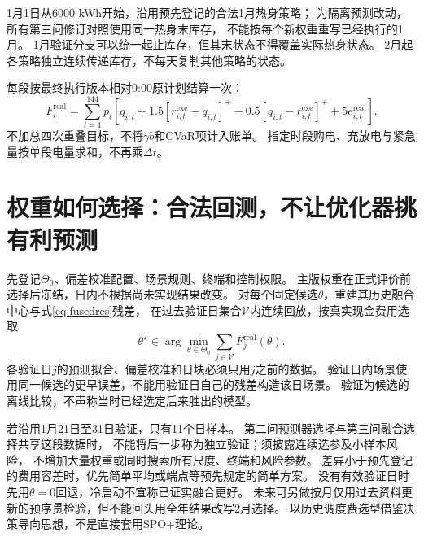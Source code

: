 \documentclass[UTF8,11pt]{ctexart}
\newcommand{\pos}[1]{[#1]^+}
\begin{document}
1月1日从6000 kWh开始，沿用预先登记的合法1月热身策略；
为隔离预测改动，所有第三问修订对照使用同一热身末库存，
不能按每个新权重重写已经执行的1月。
1月验证分支可以统一起止库存，但其末状态不得覆盖实际热身状态。
2月起各策略独立连续传递库存，不每天复制其他策略的状态。

每段按最终执行版本相对0:00原计划结算一次：
\begin{equation}\label{eq:bill}
 F_i^{\mathrm{real}}=\sum_{t=1}^{144}p_t
 \left[q_{i,t}+1.5\pos{r^{\mathrm{exe}}_{i,t}-q_{i,t}}
 -0.5\pos{q_{i,t}-r^{\mathrm{exe}}_{i,t}}+5e^{\mathrm{real}}_{i,t}\right].
\end{equation}
不加总四次重叠目标，不将$\gamma b$和CVaR项计入账单。
指定时段购电、充放电与紧急量按单段电量求和，不再乘$\Delta t$。

\section{权重如何选择：合法回测，不让优化器挑有利预测}
先登记$\Theta_0$、偏差校准配置、场景规则、终端和控制权限。
主版权重在正式评价前选择后冻结，日内不根据尚未实现结果改变。
对每个固定候选$\theta$，重建其历史融合中心与式\eqref{eq:fusedres}残差，
在过去验证日集合$\mathcal V$内连续回放，按真实现金费用选取
\begin{equation}
 \theta^\star\in\arg\min_{\theta\in\Theta_0}
                \sum_{j\in\mathcal V}F_j^{\mathrm{real}}(\theta).
\end{equation}
各验证日$j$的预测拟合、偏差校准和日块必须只用$j$之前的数据。
验证日内场景使用同一候选的更早误差，不能用验证日自己的残差构造该日场景。
验证为候选的离线比较，不声称当时已经选定后来胜出的模型。

若沿用1月21日至31日验证，只有11个日样本。
第二问预测器选择与第三问融合选择共享这段数据时，
不能将后一步称为独立验证；须披露连续选参及小样本风险，
不增加大量权重或同时搜索所有尺度、终端和风险参数。
差异小于预先登记的费用容差时，优先简单平均或端点等预先规定的简单方案。
没有有效验证日时先用$\theta=0$回退，冷启动不宣称已证实融合更好。
未来可另做按月仅用过去资料更新的预序贯检验，但不能回头用全年结果改写2月选择。
以历史调度费选型借鉴决策导向思想\cite{spo}，不是直接套用SPO+理论。
\end{document}
